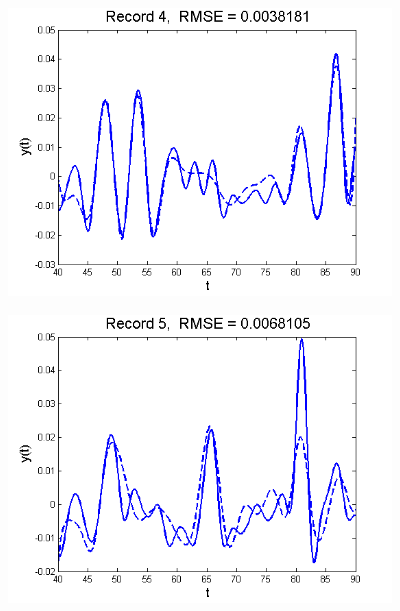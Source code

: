 \documentclass[11pt]{beamer}
\begin{document}
\begin{frame}

\begin{center}
\includegraphics[width=4in]{figs/SelTIC_fit4.png}
\end{center}

\end{frame}


\begin{frame}

\begin{center}
\includegraphics[width=4in]{figs/SelTIC_fit5.png}
\end{center}

\end{frame}

\end{document}
